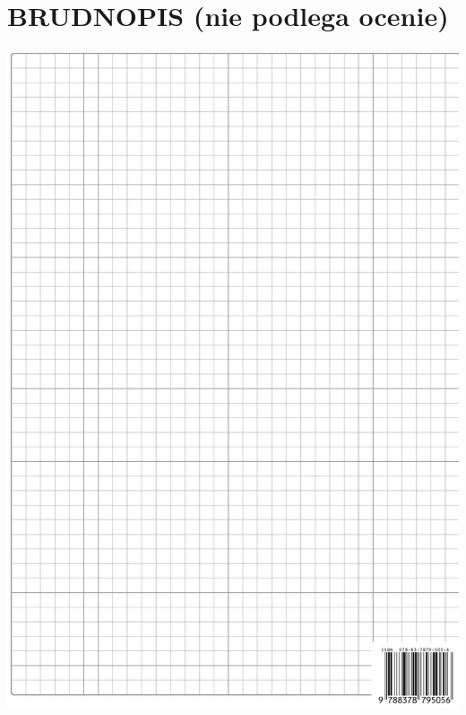 \documentclass[10pt]{article}
\begin{document}
\section*{BRUDNOPIS (nie podlega ocenie)}
\begin{center}
\includegraphics[max width=\textwidth]{2024_11_21_06df787f12c5337a1fe8g-16}
\end{center}
\end{document}
